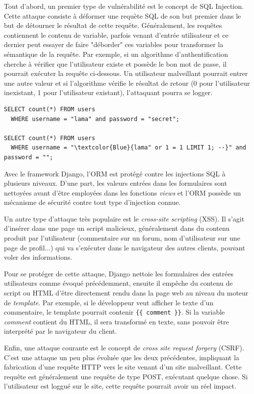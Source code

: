 \documentclass[a4paper,12pt]{article}
\begin{document}
Tout d'abord, un premier type de vulnérabilité est le concept de SQL Injection. Cette attaque
consiste à déformer une requète SQL de son but premier dans le but de détourner
le résultat de cette requête. Généralement, les requêtes contiennent le contenu
de variable, parfois venant d'entrée utilisateur et ce dernier peut essayer
de faire "déborder" ces variables pour transformer la sémantique de la requête. Par
exemple, si un algorithme d'authentification cherche à vérifier que l'utilisateur existe
et possède le bon mot de passe, il pourrait exécuter la requête ci-dessous.
Un utilisateur malveillant pourrait entrer une autre valeur et si l'algorithme
vérifie le résultat de retour (0 pour l'utilisateur inexistant, 1 pour l'utilisateur
existant), l'attaquant pourra se logger.	

\begin{Verbatim}
SELECT count(*) FROM users
  WHERE username = "lama" and password = "secret";

SELECT count(*) FROM users
  WHERE username = "\textcolor{Blue}{lama" or 1 = 1 LIMIT 1; --}" and password = "";
\end{Verbatim}

Avec le framework Django, l'ORM est protégé contre les injections SQL à plusieurs
niveaux. D'une part, les valeurs entrées dans les formulaires sont nettoyées avant
d'être employées dans les fonctions \textit{views} et l'ORM possède un mécanisme
de sécurité contre tout type d'injection connue.

Un autre type d'attaque très populaire est le \textit{cross-site scripting} (XSS).
Il s'agit d'insérer dans une page un script malicieux, généralement dans du contenu
produit par l'utilisateur (commentaire sur un forum, nom d'utilisateur sur une page de profil...)
qui va s'exécuter dans le navigateur des autres clients, pouvant voler des informations.

Pour se protéger de cette attaque, Django nettoie les formulaires des entrées utilisateurs
comme évoqué précédemment, ensuite il empêche du contenu de script ou HTML d'être directement
rendu dans la page web au niveau du moteur de \textit{template}. Par exemple,
si le développeur veut afficher le texte d'un commentaire, le template pourrait contenir
\texttt{\{\{ comment \}\}}. Si la variable \textit{comment} contient du HTML,
il sera transformé en texte, sans pouvoir être interprété par le navigateur du client.

Enfin, une attaque courante est le concept de \textit{cross site request forgery} (CSRF).
C'est une attaque un peu plus évoluée que les deux précédentes, impliquant la fabrication
d'une requête HTTP vers le site venant d'un site malveillant. Cette requête est généralement
une requête de type POST, exécutant quelque chose. Si l'utilisateur est loggué sur le site,
cette requête pourrait avoir un réel impact.
\end{document}
